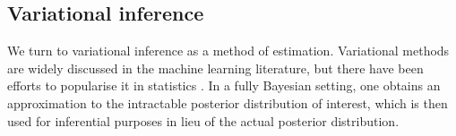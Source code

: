 %



\subsection{Variational inference}

We turn to variational inference as a method of estimation. 
Variational methods are widely discussed in the machine learning literature, but there have been efforts to popularise it in statistics \citep{blei2017variational}.
In a fully Bayesian setting, one obtains an approximation to the intractable posterior distribution of interest, which is then used for inferential purposes in lieu of the actual posterior distribution.

